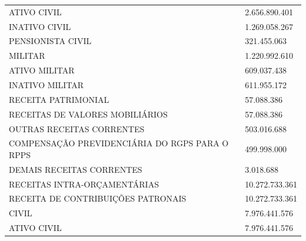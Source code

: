 \documentclass{article}
\begin{document}
\begin{longtable}[c]{m{12cm}m{3cm}}
\multicolumn{1}{L{12cm}}{\hspace{8em} ATIVO CIVIL} & \multicolumn{1}{R{3cm}}{2.656.890.401} \\
\multicolumn{1}{L{12cm}}{\hspace{8em} INATIVO CIVIL} & \multicolumn{1}{R{3cm}}{1.269.058.267} \\
\multicolumn{1}{L{12cm}}{\hspace{8em} PENSIONISTA CIVIL} & \multicolumn{1}{R{3cm}}{321.455.063} \\
\multicolumn{1}{L{12cm}}{\hspace{6em} MILITAR} & \multicolumn{1}{R{3cm}}{1.220.992.610} \\
\multicolumn{1}{L{12cm}}{\hspace{8em} ATIVO MILITAR} & \multicolumn{1}{R{3cm}}{609.037.438} \\
\multicolumn{1}{L{12cm}}{\hspace{8em} INATIVO MILITAR} & \multicolumn{1}{R{3cm}}{611.955.172} \\
\multicolumn{1}{L{12cm}}{\hspace{4em} RECEITA PATRIMONIAL} & \multicolumn{1}{R{3cm}}{57.088.386} \\
\multicolumn{1}{L{12cm}}{\hspace{6em} RECEITAS DE VALORES MOBILIÁRIOS} & \multicolumn{1}{R{3cm}}{57.088.386} \\
\multicolumn{1}{L{12cm}}{\hspace{4em} OUTRAS RECEITAS CORRENTES} & \multicolumn{1}{R{3cm}}{503.016.688} \\
\multicolumn{1}{L{12cm}}{\hspace{6em} COMPENSAÇÃO PREVIDENCIÁRIA DO RGPS PARA O RPPS} & \multicolumn{1}{R{3cm}}{499.998.000} \\
\multicolumn{1}{L{12cm}}{\hspace{6em} DEMAIS RECEITAS CORRENTES} & \multicolumn{1}{R{3cm}}{3.018.688} \\
\multicolumn{1}{L{12cm}}{\hspace{2em} RECEITAS INTRA-ORÇAMENTÁRIAS} & \multicolumn{1}{R{3cm}}{10.272.733.361} \\
\multicolumn{1}{L{12cm}}{\hspace{4em} RECEITA DE CONTRIBUIÇÕES PATRONAIS} & \multicolumn{1}{R{3cm}}{10.272.733.361} \\
\multicolumn{1}{L{12cm}}{\hspace{6em} CIVIL} & \multicolumn{1}{R{3cm}}{7.976.441.576} \\
\multicolumn{1}{L{12cm}}{\hspace{8em} ATIVO CIVIL} & \multicolumn{1}{R{3cm}}{7.976.441.576} \\

\end{longtable}
\end{document}
